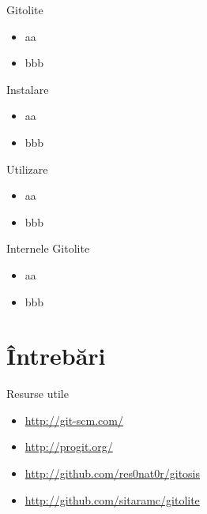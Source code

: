 \documentclass{beamer}
\begin{document}
\frame{\tableofcontents[currentsection]}

\begin{frame}{Gitolite}
	\begin{itemize}
		\item aa
		\item bbb
	\end{itemize}
\end{frame}

\begin{frame}{Instalare}
	\begin{itemize}
		\item aa
		\item bbb
	\end{itemize}
\end{frame}

\begin{frame}{Utilizare}
	\begin{itemize}
		\item aa
		\item bbb
	\end{itemize}
\end{frame}

\begin{frame}{Internele Gitolite}
	\begin{itemize}
		\item aa
		\item bbb
	\end{itemize}
\end{frame}

\section{Întrebări}

\begin{frame}{Resurse utile}
	\begin{itemize}
		\item \url{http://git-scm.com/}
		\item \url{http://progit.org/}
		\item \url{http://github.com/res0nat0r/gitosis}
		\item \url{http://github.com/sitaramc/gitolite}
	\end{itemize}
\end{frame}

\frame{\tableofcontents[currentsection]}
\end{document}
